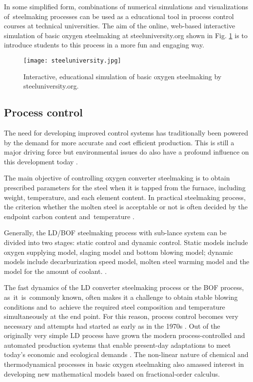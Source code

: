 In some simplified form, combinations of numerical simulations and visualizations of~steelmaking processes can be used as a educational tool in process control courses at technical universities. The aim of the online, web-based interactive simulation of basic oxygen steelmaking at steeluniversity.org shown in Fig. \ref{o:m5} is to introduce students to this process in a more fun and engaging way.

\begin{figure}[ht!]
	\centering
	\texttt{[image: steeluniversity.jpg]}
	\caption{Interactive, educational simulation of basic oxygen steelmaking by steeluniversity.org.}
	\label{o:m5}
\end{figure}

\subsection{Process control}

The need for developing improved control systems has traditionally been powered by the demand for more accurate and cost efficient production. This is still a major driving force but environmental issues do also have a profound influence on this development today \citep{Widlund1998}.

The main objective of controlling oxygen converter steelmaking is to obtain prescribed parameters for the steel when it is tapped from the furnace, including weight, temperature, and each element content. In practical steelmaking process, the criterion whether the molten steel is acceptable or not is often decided by the endpoint carbon content and~temperature \citep{Wang2010}.

Generally, the LD/BOF steelmaking process with sub-lance system can be divided into two stages: static control and dynamic control. Static models include oxygen supplying model, slaging model and bottom blowing model; dynamic models include decarburization speed model, molten steel warming model and the model for the amount of coolant. \citep{Wang2010}.

The fast dynamics of the LD converter steelmaking process or the BOF process, as~it~is~commonly known, often makes it a challenge to obtain stable blowing conditions and to~achieve the required steel composition and temperature simultaneously at the end point. For this reason, process control becomes very necessary and attempts had started as early as in the 1970s \citep{Fritz2005}. Out of the originally very simple LD process have grown the modern process-controlled and automated production systems that enable present-day adaptations to meet today's economic and ecological demands \citep{Sarkar2015}. The non-linear nature of chemical and thermodynamical processes in basic oxygen steelmaking also amassed interest in developing new mathematical models based on fractional-order calculus.

